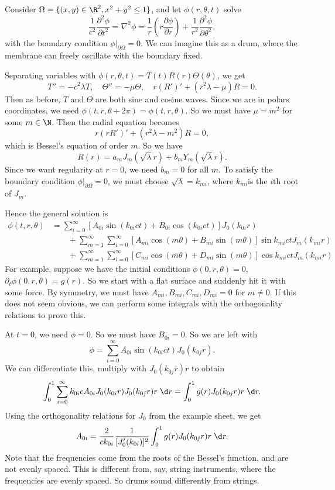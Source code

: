 \documentclass[a4paper]{article}
\begin{document}
\begin{eg}
  Consider $\Omega = \{(x, y) \in \R^2, x^2 + y^2 \leq 1\}$, and let $\phi(r, \theta, t)$ solve
  \[
    \frac{1}{c^2}\frac{\partial^2 \phi}{\partial t^2} = \nabla^2 \phi = \frac{1}{r} \left(r \frac{\partial \phi}{\partial r}\right) + \frac{1}{r^2}\frac{\partial^2\phi}{\partial \theta^2},
  \]
  with the boundary condition $\phi|_{\partial \Omega} = 0$. We can imagine this as a drum, where the membrane can freely oscillate with the boundary fixed.

  Separating variables with $\phi(r, \theta, t) = T(t) R(r) \Theta(\theta)$, we get
  \[
    T'' = - c^2 \lambda T,\quad \Theta'' = -\mu \Theta,\quad r(R')' + (r^2\lambda - \mu)R = 0.
  \]
  Then as before, $T$ and $\Theta$ are both sine and cosine waves. Since we are in polars coordinates, we need $\phi(t, r, \theta + 2\pi) = \phi(t, r, \theta)$. So we must have $\mu = m^2$ for some $m \in \N$. Then the radial equation becomes
  \[
    r(rR')' + (r^2 \lambda - m^2) R = 0,
  \]
  which is Bessel's equation of order $m$. So we have
  \[
    R(r) = a_m J_m(\sqrt{\lambda} r) + b_m Y_m(\sqrt{\lambda} r).
  \]
  Since we want regularity at $r = 0$, we need $b_m = 0$ for all $m$. To satisfy the boundary condition $\phi|_{\partial \Omega} = 0$, we must choose $\sqrt{\lambda} = k_{mi}$, where $k_{mi}$is the $i$th root of $J_m$.

  Hence the general solution is
  \begin{align*}
    \phi(t, r, \theta) &= \sum_{i = 0}^\infty [A_{0i}\sin (k_{0i} ct) + B_{0i}\cos(k_{0i}ct)] J_0 (k_{0i}r)\\\
    &\quad\quad +\sum_{m = 1}^\infty\sum_{i = 0}^\infty [A_{mi}\cos (m \theta) + B_{mi}\sin (m\theta)]\sin k_{mi}ct J_m (k_{mi} r)\\
    &\quad\quad +\sum_{m = 1}^\infty\sum_{i = 0}^\infty [C_{mi}\cos (m \theta) + D_{mi}\sin (m\theta)]\cos k_{mi}ct J_m (k_{mi} r)
  \end{align*}
  For example, suppose we have the initial conditions $\phi(0, r, \theta) = 0$, $\partial_t \phi(0, r, \theta) = g(r)$. So we start with a flat surface and suddenly hit it with some force. By symmetry, we must have $A_{mi}, B_{mi}, C_{mi}, D_{mi} = 0$ for $m \not= 0$. If this does not seem obvious, we can perform some integrals with the orthogonality relations to prove this.

  At $t = 0$, we need $\phi = 0$. So we must have $B_{0i} = 0$. So we are left with
  \[
    \phi = \sum_{i = 0}^\infty A_{0i} \sin (k_{0i} ct) J_0(k_{0j}r).
  \]
  We can differentiate this, multiply with $J_0(k_{0j} r) r$ to obtain
  \[
    \int_0^1 \sum_{i = 0}^\infty k_{0i}c A_{0i}J_0(k_{0i}r) J_0(k_{0j} r)r\;\d r = \int_0^1 g(r) J_0(k_{0j}r)r \;\d r.
  \]
  Using the orthogonality relations for $J_0$ from the example sheet, we get
  \[
    A_{0i} = \frac{2}{ck_{0i}} \frac{1}{[J_0'(k_{0i})]^2} \int_0^1 g(r)J_0(k_{0j} r) r\;\d r.
  \]
  Note that the frequencies come from the roots of the Bessel's function, and are not evenly spaced. This is different from, say, string instruments, where the frequencies are evenly spaced. So drums sound differently from strings.
\end{eg}
\end{document}
